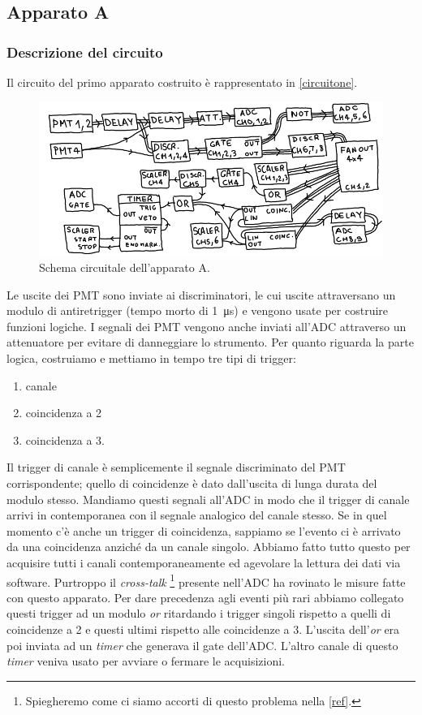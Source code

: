 \subsection{Apparato A}


\subsubsection{Descrizione del circuito}

Il circuito del primo apparato costruito è rappresentato in \autoref{circuitone}.

\begin{figure}[h]
\centering
\includegraphics[width=30 em]{immagini/circuitone}
\caption{Schema circuitale dell'apparato A.}
\label{circuitone}
\end{figure}

Le uscite dei PMT sono inviate ai discriminatori, le cui uscite attraversano un modulo di antiretrigger (tempo morto di \SI{1}{\micro s}) e vengono usate per costruire funzioni logiche. I segnali dei PMT vengono anche inviati all'ADC attraverso un attenuatore per evitare di danneggiare lo strumento.
Per quanto riguarda la parte logica, costruiamo e mettiamo in tempo tre tipi di trigger:
\begin{enumerate}
\item canale
\item coincidenza a 2
\item coincidenza a 3.
\end{enumerate}
Il trigger di canale è semplicemente il segnale discriminato del PMT corrispondente; quello di coincidenze è dato dall'uscita di lunga durata del modulo stesso. Mandiamo questi segnali all'ADC in modo che il trigger di canale arrivi in contemporanea con il segnale analogico del canale stesso. Se in quel momento c'è anche un trigger di coincidenza, sappiamo se l'evento ci è arrivato da una coincidenza anziché da un canale singolo. Abbiamo fatto tutto questo per acquisire tutti i canali contemporaneamente ed agevolare la lettura dei dati via software. Purtroppo il \emph{cross-talk}%
\footnote{Spiegheremo come ci siamo accorti di questo problema nella \autoref{ref}.} presente nell'ADC ha rovinato le misure fatte con questo apparato.
Per dare precedenza agli eventi più rari abbiamo collegato questi trigger ad un modulo \emph{or} ritardando i trigger singoli rispetto a quelli di coincidenze a 2 e questi ultimi rispetto alle coincidenze a 3. L'uscita dell'\emph{or} era poi inviata ad un \emph{timer} che generava il gate dell'ADC. L'altro canale di questo \emph{timer} veniva usato per avviare o fermare le acquisizioni.

